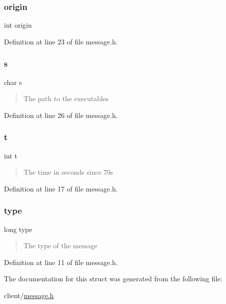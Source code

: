 \subsubsection{\texorpdfstring{origin}{origin}}
{\footnotesize\ttfamily int origin}



Definition at line 23 of file message.\+h.

\mbox{\label{structmsgbuf_a18ea610b5e5e725589fec617879ec646}} 
\subsubsection{\texorpdfstring{s}{s}}
{\footnotesize\ttfamily char s}



\begin{quote}
The path to the executables \end{quote}




Definition at line 26 of file message.\+h.

\mbox{\label{structmsgbuf_ac310d9181e916ba43604099aee272c71}} 
\subsubsection{\texorpdfstring{t}{t}}
{\footnotesize\ttfamily int t}



\begin{quote}
The time in seconds since 70s \end{quote}




Definition at line 17 of file message.\+h.

\mbox{\label{structmsgbuf_a6a83a8677f7c78fd146859325e08209a}} 
\subsubsection{\texorpdfstring{type}{type}}
{\footnotesize\ttfamily long type}



\begin{quote}
The type of the message \end{quote}




Definition at line 11 of file message.\+h.



The documentation for this struct was generated from the following file\+:\begin{DoxyCompactItemize}
\item 
client/\hyperlink{client_2message_8h}{message.\+h}\end{DoxyCompactItemize}
